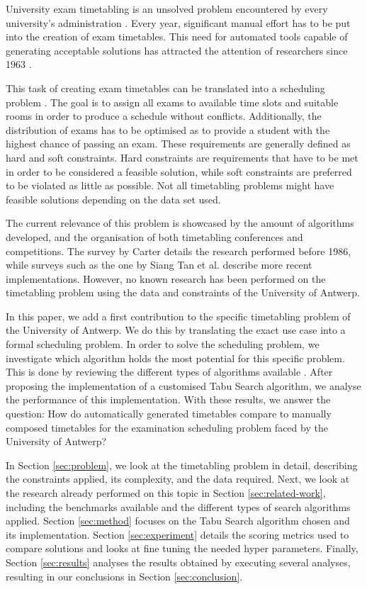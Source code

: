 University exam timetabling is an unsolved problem encountered by every university's administration \cite{even1976}. Every year, significant manual effort has to be put into the creation of exam timetables. This need for automated tools capable of generating acceptable solutions has attracted the attention of researchers since 1963 \cite{gotlieb1963}. 

This task of creating exam timetables can be translated into a scheduling problem \cite{BurkeScheduling2004}. The goal is to assign all exams to available time slots and suitable rooms in order to produce a schedule without conflicts. Additionally, the distribution of exams has to be optimised as to provide a student with the highest chance of passing an exam. These requirements are generally defined as hard and soft constraints. Hard constraints are requirements that have to be met in order to be considered a feasible solution, while soft constraints are preferred to be violated as little as possible. Not all timetabling problems might have feasible solutions depending on the data set used.

The current relevance of this problem is showcased by the amount of algorithms developed, and the organisation of both timetabling conferences and competitions. The survey by Carter \cite{carter1986} details the research performed before 1986, while surveys such as the one by Siang Tan et al. \cite{joo2021} describe more recent implementations. However, no known research has been performed on the timetabling problem using the data and constraints of the University of Antwerp.

In this paper, we add a first contribution to the specific timetabling problem of the University of Antwerp. We do this by translating the exact use case into a formal scheduling problem. In order to solve the scheduling problem, we investigate which algorithm holds the most potential for this specific problem. This is done by reviewing the different types of algorithms available \cite{joo2021, kristiansenSurvey2013, chen2021, rong2009}. After proposing the implementation of a customised Tabu Search algorithm, we analyse the performance of this implementation. With these results, we answer the question: How do automatically generated timetables compare to manually composed timetables for the examination scheduling problem faced by the University of Antwerp?

In Section \ref{sec:problem}, we look at the timetabling problem in detail, describing the constraints applied, its complexity, and the data required. Next, we look at the research already performed on this topic in Section \ref{sec:related-work}, including the benchmarks available and the different types of search algorithms applied. Section \ref{sec:method} focuses on the Tabu Search algorithm chosen and its implementation. Section \ref{sec:experiment} details the scoring metrics used to compare solutions and looks at fine tuning the needed hyper parameters. Finally, Section \ref{sec:results} analyses the results obtained by executing several analyses, resulting in our conclusions in Section \ref{sec:conclusion}. 